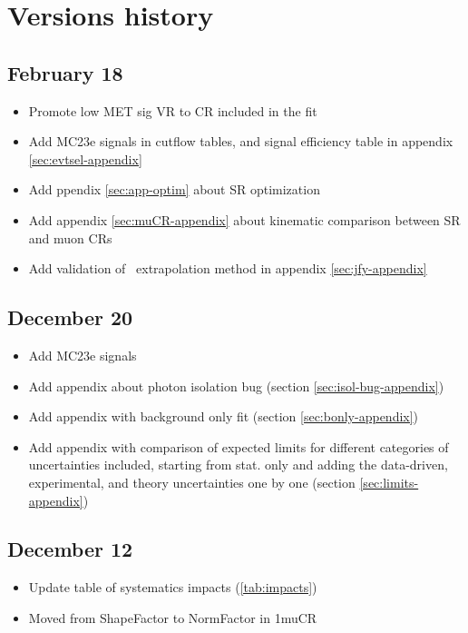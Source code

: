
\section{Versions history}
\subsection{February 18}

\begin{itemize}
	\item Promote low MET sig VR to CR included in the fit
	\item Add MC23e signals in cutflow tables, and signal efficiency table in appendix \ref{sec:evtsel-appendix}
	\item Add ppendix \ref{sec:app-optim} about SR optimization
	\item Add appendix \ref{sec:muCR-appendix} about kinematic comparison between SR and muon CRs
	\item Add validation of \jfakey\ extrapolation method in appendix \ref{sec:jfy-appendix}
\end{itemize} 

\subsection{December 20}

\begin{itemize}
	\item Add MC23e signals
	\item Add appendix about photon isolation bug (section \ref{sec:isol-bug-appendix}) 
	\item Add appendix with background only fit (section \ref{sec:bonly-appendix})
	\item Add appendix with comparison of expected limits for different categories of uncertainties included, starting from stat. only and adding the data-driven, experimental, and theory uncertainties one by one (section \ref{sec:limits-appendix})
\end{itemize} 

\subsection{December 12}

\begin{itemize}
	\item Update table of systematics impacts (\ref{tab:impacts})
	\item Moved from ShapeFactor to NormFactor in 1muCR 
\end{itemize} 
